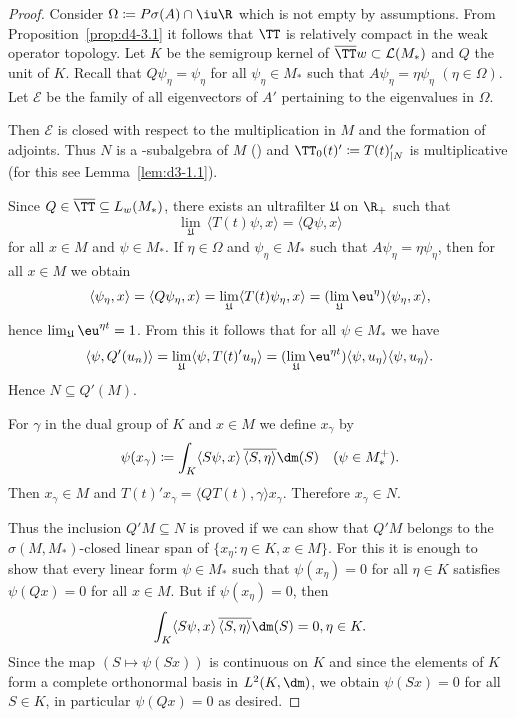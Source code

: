 \begin{proof}
Consider $\Omega \coloneqq P\sigma(A) \cap \iu  \R$ which is not empty by assumptions.
From Proposition~\ref{prop:d4-3.1} it follows that $\TT$ is relatively compact in the weak operator topology.
Let $K$ be the semigroup kernel of\/ $\overline{\TT}{w} \subset \mathcal{L}{(M_{*})}$ and $Q$ the unit of\/ $K$.
Recall that $Q\psi_{\eta} = \psi_{\eta}$ for all $\psi_{\eta} \in M_{*}$ such that $A\psi_{\eta} = \eta\psi_{\eta}$ $(\eta \in \Omega)$.
Let $\mathcal{E}$ be the family of all eigenvectors of\/ $A'$ pertaining to the eigenvalues in $\Omega$.

Then $\mathcal{E}$ is closed with respect to the multiplication in $M$ and the formation of adjoints.
Thus $N$ is a \WA-subalgebra of\/ $M$ (\textcite[Corollary 1.7.9.]{sakai:1971}) and $\TT_{0}(t)' \coloneqq T(t)'_{|N}$ is multiplicative (for this see Lemma~\ref{lem:d3-1.1}).

Since $Q \in \overline{\TT}  \subseteq L_{w}(M_{*})$, there exists an ultrafilter $\mathfrak{U}$ on $\R_{+}$ such that 
%
\[
	\lim_{\mathfrak{U}} \, \langle T(t)\psi,x\rangle = \langle Q\psi,x\rangle
\]
%
for all $x \in M$ and $\psi \in M_{*}$.
If\/ $\eta \in \Omega$ and $\psi_{\eta} \in M_{*}$ such that $A\psi_{\eta} = \eta\psi_{\eta}$, then for all $x \in M$ we obtain
\[
\langle \psi_{\eta} ,x \rangle = \langle Q\psi_{\eta},x \rangle = \lim_{\mathfrak{U}} \langle T(t)\psi_{\eta},x \rangle = 
(\lim_{\mathfrak{U}} \eu^{\eta}) \langle \psi_{\eta}, x \rangle,
\]
hence $\lim_{\mathfrak{U}} \eu^{\eta t} = 1$.
From this it follows that for all $\psi \in M_{*}$ we have
\[
\langle\psi,Q'(u_{n})\rangle = \lim_{\mathfrak{U}} \langle\psi,T(t)'u_{\eta}\rangle 
= (\lim_{\mathfrak{U}} \eu^{\eta t})\langle\psi,u_{\eta}\rangle 
 \langle\psi,u_{\eta}\rangle.
\]
Hence $N \subseteq Q'(M)$.

For $\gamma$ in the dual group of\/ $K$ and $x \in M$ we define $x_{\gamma}$ by
\[
\psi(x_{\gamma}) \coloneqq \int_{K} 
	\langle S\psi ,x \rangle \, \overline{\langle S,\eta \rangle}  \dm(S) \quad (\psi \in M_{*}^{+}).
\]
Then $x_{\gamma} \in M$ and $T(t)'x_{\gamma} = \langle QT(t),\gamma\rangle x_{\gamma}$.
Therefore $x_{\gamma} \in N$.

Thus the inclusion $Q'M \subseteq N$ is proved if we can show that $Q'M$ belongs to the $\sigma(M,M_{*})$-closed linear span of\/ $\{x_{\eta} \colon \eta \in K, x \in M\}$.
For this it is enough to show that every linear form $\psi \in M_{*}$ such that $\psi(x_{\eta}) = 0$ for all $\eta \in K$ satisfies $\psi(Qx) = 0$ for all $x \in M$.
But if\/ $\psi(x_{\eta}) = 0$, then
\[
\int_{K} \langle S\psi,x \rangle \, \overline{\langle S,\eta \rangle} \dm (S) = 0, \eta \in K.
\]
Since the map $(S \mapsto \psi(Sx))$ is continuous on $K$ and since the elements of\/ $K$ form a complete orthonormal basis in $L^2(K,\dm)$, we obtain $\psi(Sx) = 0$ for all $S \in K$, in particular $\psi(Qx) = 0$ as desired.


\end{proof}
